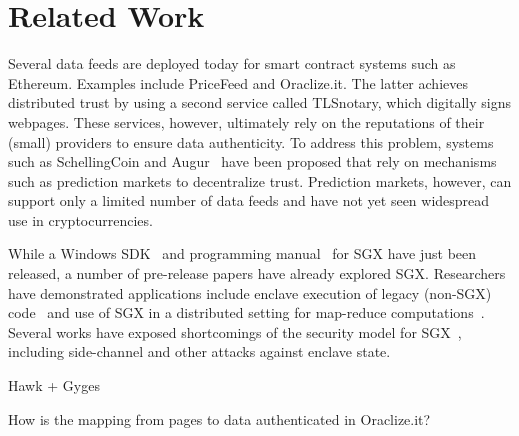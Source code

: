 \section{Related Work}

Several data feeds are deployed today for smart contract systems such as Ethereum. Examples include PriceFeed and Oraclize.it. The latter achieves distributed trust by using a second service called TLSnotary, which digitally signs webpages. These services, however, ultimately rely on the reputations of their (small) providers to ensure data authenticity.  To address this problem, systems such as SchellingCoin and Augur~\cite{} have been proposed that rely on mechanisms such as prediction markets to decentralize trust. Prediction markets, however, can support only a limited number of data feeds and have not yet seen widespread use in cryptocurrencies. 

While a Windows SDK~\cite{} and programming manual~\cite{} for SGX have just been released, a number of pre-release papers have already explored SGX. Researchers have demonstrated applications include enclave execution of legacy (non-SGX) code~\cite{Haven} and use of SGX in a distributed setting for map-reduce computations~\cite{VC3}. Several works have exposed shortcomings of the security model for SGX~\cite{}, including side-channel and other attacks against enclave state. 

Hawk + Gyges

How is the mapping from pages to data authenticated in Oraclize.it?
